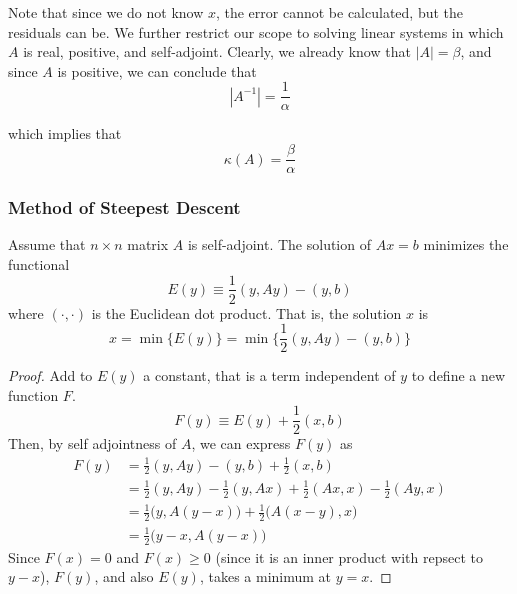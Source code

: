   Note that since we do not know $x$, the error cannot be calculated, but the residuals can be. We further restrict our scope to solving linear systems in which $A$ is real, positive, and self-adjoint. Clearly, we already know that $|A| = \beta$, and since $A$ is positive, we can conclude that 
  \begin{equation}
    |A^{-1}| = \frac{1}{\alpha}
  \end{equation}

  which implies that
  \begin{equation}
    \kappa(A) = \frac{\beta}{\alpha}
  \end{equation}

\subsubsection{Method of Steepest Descent}

  \begin{theorem}
    Assume that $n \times n$ matrix $A$ is self-adjoint. The solution of $Ax = b$ minimizes the functional 
    \begin{equation}
      E(y) \equiv \frac{1}{2} (y, A y) - (y, b)
    \end{equation}
    where $(\cdot, \cdot)$ is the Euclidean dot product. That is, the solution $x$ is
    \begin{equation}
      x = \min \big\{ E(y) \big\} = \min \Big\{ \frac{1}{2} (y, Ay) - (y, b) \Big\}
    \end{equation}
  \end{theorem}
  \begin{proof}
    Add to $E(y)$ a constant, that is a term independent of $y$ to define a new function $F$. 
    \[F(y) \equiv E(y) + \frac{1}{2} (x, b)\]
    Then, by self adjointness of $A$, we can express $F(y)$ as 
    \begin{align}
      F(y) & = \frac{1}{2} (y, Ay) - (y, b) + \frac{1}{2} (x, b) \\
           & = \frac{1}{2} (y, Ay) - \frac{1}{2} (y, Ax) + \frac{1}{2} (Ax, x) - \frac{1}{2} (Ay, x) \\
           & = \frac{1}{2} \big( y, A(y-x)\big) + \frac{1}{2} \big( A(x-y), x\big) \\
           & = \frac{1}{2} \big( y - x, A(y - x)\big) 
    \end{align}
    Since $F(x) = 0$ and $F(x) \geq 0$ (since it is an inner product with repsect to $y-x$), $F(y)$, and also $E(y)$, takes a minimum at $y =x$. 
  \end{proof}

